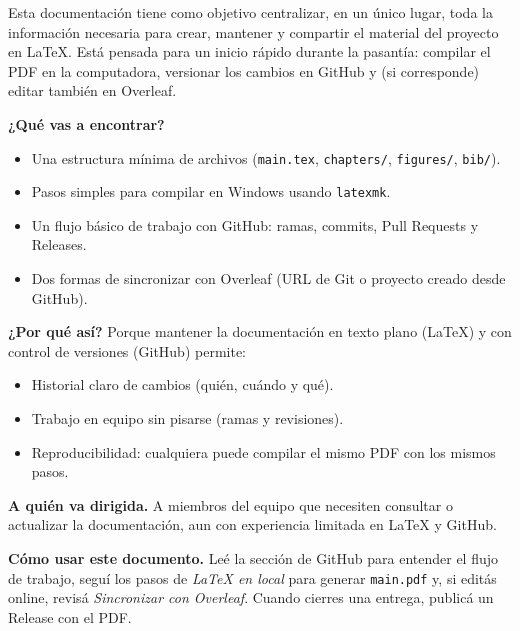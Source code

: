 Esta documentación tiene como objetivo centralizar, en un único lugar, toda la información
necesaria para crear, mantener y compartir el material del proyecto en \LaTeX. Está pensada
para un inicio rápido durante la pasantía: compilar el PDF en la computadora, versionar los
cambios en GitHub y (si corresponde) editar también en Overleaf.

\textbf{¿Qué vas a encontrar?}
\begin{itemize}
  \item Una estructura mínima de archivos (\texttt{main.tex}, \texttt{chapters/}, \texttt{figures/}, \texttt{bib/}).
  \item Pasos simples para compilar en Windows usando \texttt{latexmk}.
  \item Un flujo básico de trabajo con GitHub: ramas, commits, Pull Requests y Releases.
  \item Dos formas de sincronizar con Overleaf (URL de Git o proyecto creado desde GitHub).
\end{itemize}

\textbf{¿Por qué así?} Porque mantener la documentación en texto plano (\LaTeX) y con control
de versiones (GitHub) permite:
\begin{itemize}
  \item Historial claro de cambios (quién, cuándo y qué).
  \item Trabajo en equipo sin pisarse (ramas y revisiones).
  \item Reproducibilidad: cualquiera puede compilar el mismo PDF con los mismos pasos.
\end{itemize}

\textbf{A quién va dirigida.} A miembros del equipo que necesiten consultar o
actualizar la documentación, aun con experiencia limitada en \LaTeX{} y GitHub.

\textbf{Cómo usar este documento.} Leé la sección de GitHub para entender el flujo de trabajo,
seguí los pasos de \emph{LaTeX en local} para generar \texttt{main.pdf} y, si editás online,
revisá \emph{Sincronizar con Overleaf}. Cuando cierres una entrega, publicá un Release con el PDF.
